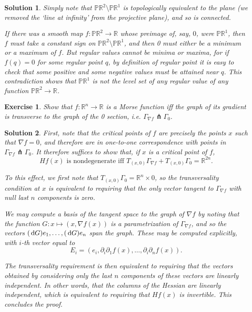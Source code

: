 \documentclass{article}
\newtheorem{ex}{Exercise}
\theoremstyle{nonumberplain}
\newtheorem{sol}{Solution}
\newcommand{\R}{\mathbb{R}}
\newcommand{\PP}{\mathbb{P}}
\newcommand{\grad}{\nabla}
\begin{document}
\begin{sol}
Simply note that $\PP\R^2 \setminus \PP\R^1$ is topologically equivalent to the plane (we removed the `line at infinity' from the projective plane), and so is connected.

If there was a smooth map $f \colon \PP\R^2 \to \R$ whose preimage of, say, $0$, were $\PP\R^1$, then $f$ must take a constant sign on $\PP\R^2 \setminus \PP\R^1$, and then 0 must either be a minimum or a maximum of $f$. But regular values cannot be minima or maxima, for if $f(q) = 0$ for some regular point $q$, by definition of regular point it is easy to check that some positive and some negative values must be attained near $q$. This contradiction shows that $\PP\R^1$ is not the level set of any regular value of any function $\PP\R^2 \to \R$.
\end{sol}

\begin{ex}
Show that $f \colon \R^n \to \R$ is a Morse function iff the graph of its gradient is transverse to the graph of the 0 section, i.e. $\Gamma_{\grad f} \pitchfork \Gamma_0$.
\end{ex}

\begin{sol}
First, note that the critical points of $f$ are precisely the points $x$ such that $\grad f = 0$, and therefore are in one-to-one correspondence with points in $\Gamma_{\grad f} \pitchfork \Gamma_0$. It therefore suffices to show that, if $x$ is a critical point of $f$,
\[Hf(x) \text{ is nondegenerate iff } T_{(x,0)} \Gamma_{\grad f} + T_{(x,0)} \Gamma_0 = \R^{2n}.\]

To this effect, we first note that $T_{(x,0)} \Gamma_0 = \R^n \times 0$, so the transversality condition at $x$ is equivalent to requiring that the only vector tangent to $\Gamma_{\grad f}$ with null last $n$ components is zero.

We may compute a basis of the tangent space to the graph of $\grad f$ by noting that the function $G \colon x \mapsto (x, \grad f(x))$ is a parametrization of $\Gamma_{\grad f}$, and so the vectors $(\dl G) e_1, \dots, (\dl G) e_n$ span the graph. These may be computed explicitly, with $i$-th vector equal to
\[E_i = (e_i, \partial_i \partial_1 f(x), \dots, \partial_i \partial_n f(x)).\]

The transversality requirement is then equivalent to requiring that the vectors obtained by considering only the last $n$ components of these vectors are linearly independent. In other words, that the columns of the Hessian are linearly independent, which is equivalent to requiring that $Hf(x)$ is invertible. This concludes the proof.
\end{sol}
\end{document}
